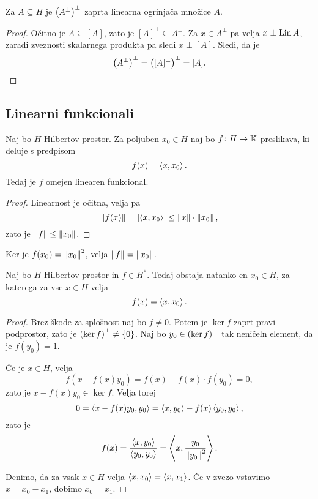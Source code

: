 \begin{posledica}
Za $A \subseteq H$ je $\left(A^\bot\right)^\bot$ zaprta linearna ogrinjača
množice $A$.
\end{posledica}

\begin{proof}
Očitno je $A \subseteq [A]$, zato je $[A]^\bot \subseteq A^\bot$.
Za $x \in A^\bot$ pa velja $x \perp \operatorname{Lin} A$, zaradi zveznosti
skalarnega produkta pa sledi $x \perp [A]$. Sledi, da je
\[
\left(A^\bot\right)^\bot = \left([A]^\bot\right)^\bot = [A]. \qedhere
\]
\end{proof}

\newpage

\subsection{Linearni funkcionali}

\begin{trditev}
Naj bo $H$ Hilbertov prostor. Za poljuben $x_0 \in H$ naj bo
$f \colon H \to \mathbb{K}$ preslikava, ki deluje s predpisom
\[
f(x) = \left\langle x,x_0\right\rangle.
\]
Tedaj je $f$ omejen linearen funkcional.
\end{trditev}

\begin{proof}
Linearnost je očitna, velja pa
\[
\left\lVert f(x)\right\rVert = \left\lvert \left\langle x,x_0\right\rangle\right\rvert \leq \left\lVert x\right\rVert \cdot \left\lVert x_0\right\rVert,
\]
zato je $\left\lVert f\right\rVert \leq \left\lVert x_0\right\rVert$.
\end{proof}

\begin{opomba}
Ker je $f(x_0) = \left\lVert x_0\right\rVert^2$, velja $\left\lVert f\right\rVert = \left\lVert x_0\right\rVert$.
\end{opomba}

\begin{izrek}[Riesz]
Naj bo $H$ Hilbertov prostor in $f \in H^*$. Tedaj obstaja natanko
en $x_0 \in H$, za katerega za vse $x \in H$ velja
\[
f(x) = \left\langle x, x_0\right\rangle.
\]
\end{izrek}

\begin{proof}
Brez škode za splošnost naj bo $f \ne 0$. Potem je $\ker f$ 
zaprt pravi podprostor, zato je $\left(\ker f\right)^\bot \ne \left\{0\right\}$.
Naj bo $y_0 \in \left(\ker f\right)^\bot$ tak neničeln element, da je
$f(y_0) = 1$.

Če je $x \in H$, velja
\[
f(x - f(x)y_0) = f(x) - f(x) \cdot f(y_0) = 0,
\]
zato je $x - f(x)y_0 \in \ker f$. Velja torej
\[
0 = \left\langle x - f(x) y_0, y_0\right\rangle = \left\langle x,y_0\right\rangle - f(x) \left\langle y_0,y_0\right\rangle,
\]
zato je
\[
f(x) = \frac{\left\langle x,y_0\right\rangle}{\left\langle y_0,y_0\right\rangle} =
\left\langle x, \frac{y_0}{\left\lVert y_0\right\rVert^2}\right\rangle.
\]

Denimo, da za vsak $x \in H$ velja $\left\langle x,x_0\right\rangle = \left\langle x,x_1\right\rangle$. Če
v zvezo vstavimo $x = x_0 - x_1$, dobimo $x_0 = x_1$.
\end{proof}

